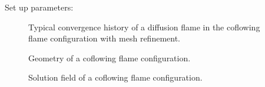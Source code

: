 Set up parameters: 
\begin{figure}[t!]
	\centering
	\caption{Typical convergence history of a diffusion flame in the coflowing flame configuration with mesh refinement.}
	\label{fig:CoFlow_ConvergenceStory}
\end{figure}
\begin{figure}[t]
	\centering
	\def\svgwidth{0.43\textwidth}
	\qquad\quad
	\def\svgwidth{0.35\textwidth}
	\caption{Geometry of a coflowing flame configuration.} \label{fig:CoFlowGeometry}
\end{figure}


\begin{figure}[t]
	\centering
	\pgfplotsset{width=0.6\textwidth, compat=1.3}
	\par\bigskip
	\caption{Solution field of a coflowing flame configuration.} \label{fig:CoFlowFlameFig}
\end{figure}

\FloatBarrier